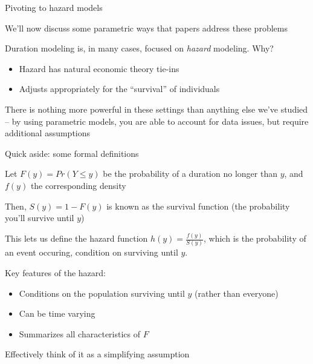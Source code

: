 \documentclass[notes,11pt, aspectratio=169]{beamer}
\newenvironment{wideitemize}{\itemize\addtolength{\itemsep}{10pt}}{\enditemize}
\begin{document}
\begin{frame}{Pivoting to hazard models}
  \begin{wideitemize}
  \item We'll now discuss some parametric ways that papers address these problems
  \item   Duration modeling is, in many cases, focused on \emph{hazard} modeling. Why?
      \begin{itemize}
  \item Hazard has natural economic theory tie-ins
  \item Adjusts appropriately for the ``survival'' of individuals
  \end{itemize}
\item There is nothing more powerful in these settings than anything
  else we've studied -- by using parametric models, you are able to
  account for data issues, but require additional assumptions
  \end{wideitemize}
\end{frame}

\begin{frame}{Quick aside: some formal definitions}
  \begin{wideitemize}
  \item Let $F(y) = Pr(Y \leq y)$ be the probability of a duration no longer than $y$, and $f(y)$ the corresponding density
  \item Then, $S(y) = 1-F(y)$ is known as the survival function (the
    probability you'll survive until $y$)
  \item This lets us define the hazard function
    $h(y) = \frac{f(y)}{S(y)}$, which is the probability of an event
    occuring, condition on surviving until $y$.
  \item Key features of the hazard:
    \begin{itemize}
    \item Conditions on the population surviving until $y$ (rather
      than everyone)
    \item Can be time varying
    \item Summarizes all characteristics of $F$
    \end{itemize}
  \item Effectively think of it as a simplifying assumption 
  \end{wideitemize}
\end{frame}
\end{document}
